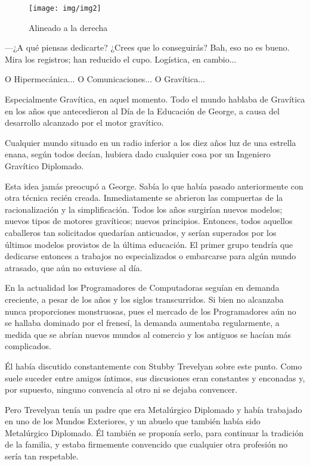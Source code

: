\documentclass[11pt,letterpaper]{article}
\begin{document}
	\begin{wrapfigure}{l}[15pt]{0.4\textwidth} %
		\centering
		\texttt{[image: img/img2]} %
		\caption{Alineado a la derecha}
	\end{wrapfigure}

—¿A qué piensas dedicarte? ¿Crees que lo conseguirás? Bah, eso no es bueno. Mira los registros; han reducido el cupo. Logística, en cambio...

O Hipermecánica... O Comunicaciones... O Gravítica...

Especialmente Gravítica, en aquel momento. Todo el mundo hablaba de Gravítica en los años que antecedieron al Día de la Educación de George, a causa del desarrollo alcanzado por el motor gravítico.

Cualquier mundo situado en un radio inferior a los diez años luz de una estrella enana, según todos decían, hubiera dado cualquier cosa por un Ingeniero Gravítico Diplomado.

Esta idea jamás preocupó a George. Sabía lo que había pasado anteriormente con otra técnica recién creada. Inmediatamente se abrieron las compuertas de la racionalización y la simplificación. Todos los años surgirían nuevos modelos; nuevos tipos de motores gravíticos; nuevos principios. Entonces, todos aquellos caballeros tan solicitados quedarían anticuados, y serían superados por los últimos modelos provistos de la última educación. El primer grupo tendría que dedicarse entonces a trabajos no especializados o em­barcarse para algún mundo atrasado, que aún no estuviese al día.

En la actualidad los Programadores de Computadoras seguían en demanda creciente, a pesar de los años y los siglos transcurridos. Si bien no alcanzaba nunca proporciones monstruosas, pues el mer­cado de los Programadores aún no se hallaba dominado por el frenesí, la demanda aumentaba regularmente, a medida que se abrían nuevos mundos al comercio y los antiguos se hacían más complicados.

Él había discutido constantemente con Stubby Trevelyan sobre este punto. Como suele suceder entre amigos íntimos, sus discusio­nes eran constantes y enconadas y, por supuesto, ninguno convencía al otro ni se dejaba convencer.

Pero Trevelyan tenía un padre que era Metalúrgico Diplomado y había trabajado en uno de los Mundos Exteriores, y un abuelo que también había sido Metalúrgico Diplomado. Él también se propo­nía serlo, para continuar la tradición de la familia, y estaba firme­mente convencido que cualquier otra profesión no sería tan res­petable.
\end{document}
